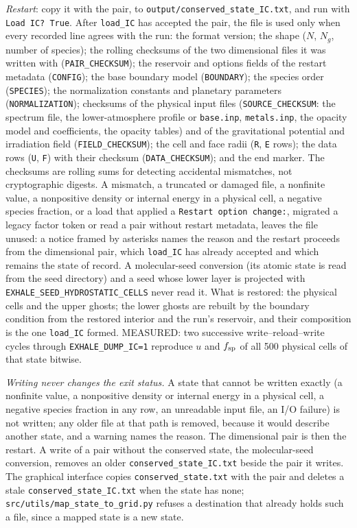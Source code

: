 \documentclass[english,a4paper]{my_memo}
\begin{document}
\emph{Restart}: copy it with the pair, to
\texttt{output/conserved\_state\_IC.txt}, and run with \texttt{Load IC?\ True}.
After \texttt{load\_IC} has accepted the pair, the file is used only when every
recorded line agrees with the run: the format version; the shape
($N$, $N_g$, number of species); the rolling checksums of the two dimensional
files it was written with (\texttt{PAIR\_CHECKSUM}); the reservoir and options
fields of the restart metadata (\texttt{CONFIG}); the base boundary model
(\texttt{BOUNDARY}); the species order (\texttt{SPECIES}); the normalization
constants and planetary parameters (\texttt{NORMALIZATION}); checksums of the
physical input files (\texttt{SOURCE\_CHECKSUM}: the spectrum file, the
lower-atmosphere profile or \texttt{base.inp}, \texttt{metals.inp}, the
opacity model and coefficients, the opacity tables) and of the gravitational
potential and irradiation field (\texttt{FIELD\_CHECKSUM}); the cell and face
radii (\texttt{R}, \texttt{E} rows); the data rows (\texttt{U}, \texttt{F})
with their checksum (\texttt{DATA\_CHECKSUM}); and the end marker. The
checksums are rolling sums for detecting accidental mismatches, not
cryptographic digests. A mismatch, a truncated or damaged file, a nonfinite
value, a nonpositive density or internal energy in a physical cell, a negative
species fraction, or a load that applied a \texttt{Restart option change:},
migrated a legacy factor token or read a pair without restart metadata,
leaves the file unused: a notice framed by asterisks names the reason and the
restart proceeds from the dimensional pair, which \texttt{load\_IC} has
already accepted and which remains the state of record. A molecular-seed
conversion (its atomic state is read from the seed directory) and a seed whose
lower layer is projected with \texttt{EXHALE\_SEED\_HYDROSTATIC\_CELLS} never
read it. What is restored: the physical cells and the upper ghosts; the lower
ghosts are rebuilt by the boundary condition from the restored interior and
the run's reservoir, and their composition is the one \texttt{load\_IC}
formed. MEASURED: two successive write--reload--write cycles through
\texttt{EXHALE\_DUMP\_IC=1} reproduce $u$ and $f_{\rm sp}$ of all 500
physical cells of that state bitwise.

\emph{Writing never changes the exit status.} A state that cannot be written
exactly (a nonfinite value, a nonpositive density or internal energy in a
physical cell, a negative species fraction in any row, an unreadable input
file, an I/O failure) is not written; any older file at that path is removed,
because it would describe another state, and a warning names the reason. The
dimensional pair is then the restart. A write of a pair without the conserved
state, the molecular-seed conversion, removes an older
\texttt{conserved\_state\_IC.txt} beside the pair it writes. The graphical
interface copies \texttt{conserved\_state.txt} with the pair and deletes a
stale \texttt{conserved\_state\_IC.txt} when the state has none;
\texttt{src/utils/map\_state\_to\_grid.py} refuses a destination that already
holds such a file, since a mapped state is a new state.
\end{document}
